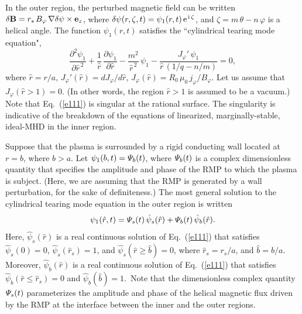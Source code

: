 \documentclass[12pt,prb,aps]{revtex4-1}
\begin{document}
In the outer region, the perturbed magnetic field can be written $\delta {\bf B} = r_s\,B_\varphi\,\nabla\delta \psi\times{\bf e}_z$, where
$\delta\psi(r,\zeta,t) = \psi_1(r,t)\,{\rm e}^{\,{\rm i}\,\zeta}$,
and $\zeta=m\,\theta-n\,\varphi$ is a helical angle.\cite{err1}
The function $\psi_1(r,t)$ satisfies the ``cylindrical tearing mode equation",\cite{err1,ric3,cyl,wes}
\begin{equation}\label{e111}
\frac{\partial^2\psi_1}{\partial\hat{r}^{\,2}} + \frac{1}{\hat{r}}\,\frac{\partial\psi_1}{\partial\hat{r}}-\frac{m^2}{\hat{r}^{\,2}}\,\psi_1
- \frac{J_\varphi'\,\psi_1}{\hat{r}\,(1/q-n/m)} = 0,
\end{equation}
where $\hat{r}=r/a$, $J_\varphi'(\hat{r})= dJ_\varphi/d\hat{r}$,
$J_\varphi(\hat{r}) = R_0\,\mu_0\,j_\varphi/B_\varphi$. 
Let us assume that $J_\varphi(\hat{r}>1)=0$.  (In other words, the region $\hat{r}>1$ is assumed to be a vacuum.)
Note that Eq.~(\ref{e111}) is singular at the  rational surface. The singularity is indicative of the breakdown of the equations of linearized, 
marginally-stable, ideal-MHD in the  inner region.
 
Suppose that the plasma is surrounded by a rigid conducting wall located at $r=b$, where $b>a$. 
Let $\psi_1(b,t) = {\mit\Psi}_b(t)$, where ${\mit\Psi}_b(t)$ is a complex dimensionless quantity that specifies the amplitude and phase of the
RMP to which the plasma is subject. (Here, we are assuming that the RMP is generated by a wall perturbation, for the sake of definiteness.) The most general solution to the cylindrical tearing mode equation in the outer region is written 
\begin{equation}\label{e73}
\psi_1(\hat{r},t) = {\mit\Psi}_s(t)\,\hat\psi_s(\hat{r}) + {\mit\Psi}_b(t)\,\hat{\psi}_b(\hat{r}). 
\end{equation}
Here, $\hat{\psi}_s(\hat{r})$ is a real continuous solution of Eq.~(\ref{e111}) that satisfies 
$\hat{\psi}_s(0) = 0$, $\hat{\psi}_s(\hat{r}_s)= 1$,
and $\hat{\psi}_s(\hat{r}\geq \hat{b}) = 0$,
where $\hat{r}_s=r_s/a$, and $\hat{b}= b/a$. 
Moreover, $\hat{\psi}_b(\hat{r})$ is a real continuous solution of Eq.~(\ref{e111}) that satisfies
$\hat{\psi}_b(\hat{r}\leq \hat{r}_s) = 0$ and 
$\hat{\psi}_b(\hat{b})= 1$.\
Note that the dimensionless complex quantity ${\mit\Psi}_s(t)$ parameterizes the amplitude and phase  of the
helical magnetic flux driven  by the RMP at the interface between the inner and the outer regions.
\end{document}
